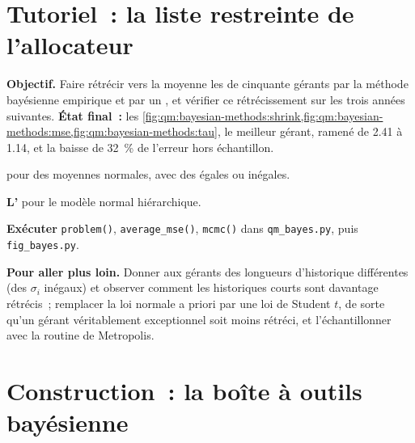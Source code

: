 \section{Tutoriel~: la liste restreinte de l'allocateur}\label{tut:qm:bayesian-methods:shortlist}

\begin{tutorial}
\textbf{Objectif.} Faire rétrécir vers la moyenne les  de cinquante gérants par la méthode bayésienne empirique et par un , et vérifier ce rétrécissement sur les trois
années suivantes. \textbf{État final~:} les \cref{fig:qm:bayesian-methods:shrink,fig:qm:bayesian-methods:mse,fig:qm:bayesian-methods:tau}, le meilleur
gérant, ramené de 2.41 à 1.14, et la baisse de 32~\% de l'erreur hors échantillon.
\begin{tutsteps}
\item \textbf{} pour des moyennes normales, avec des  égales ou inégales.
\label{lst:qm:bayesian-methods:eb}
\item \textbf{L'} pour le modèle normal hiérarchique.
\label{lst:qm:bayesian-methods:gibbs}
\item \textbf{Exécuter} \texttt{problem()}, \texttt{average\_mse()}, \texttt{mcmc()} dans \texttt{qm\_bayes.py}, puis \texttt{fig\_bayes.py}.
\end{tutsteps}
\textbf{Pour aller plus loin.} Donner aux gérants des longueurs d'historique différentes (des $\sigma_i$ inégaux) et observer comment les historiques courts
sont davantage rétrécis~; remplacer la loi normale a priori par une loi de Student $t$, de sorte qu'un gérant véritablement exceptionnel soit moins rétréci, et l'échantillonner avec la
routine de Metropolis.
\end{tutorial}

\section{Construction~: la boîte à outils bayésienne}\label{bld:qm:bayesian-methods:bayes}

